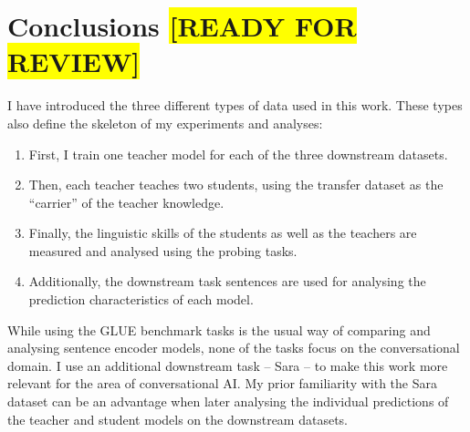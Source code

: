 \documentclass[bsc,frontabs,twoside,singlespacing,parskip,deptreport]{infthesis}
\def\reviewready{\colorbox{yellow}{[READY FOR REVIEW]}}
\begin{document}
{  \section{Conclusions \reviewready}{
    I have introduced the three different types of data used in this work. These types also define the skeleton of my experiments and analyses:
    \begin{enumerate}
      \item First, I train one teacher model for each of the three downstream datasets.
      \item Then, each teacher teaches two students, using the transfer dataset as the ``carrier'' of the teacher knowledge.
      \item Finally, the linguistic skills of the students as well as the teachers are measured and analysed using the probing tasks.
      \item Additionally, the downstream task sentences are used for analysing the prediction characteristics of each model.
    \end{enumerate}
    While using the GLUE benchmark tasks is the usual way of comparing and analysing sentence encoder models, none of the tasks focus on the conversational domain. I use an additional downstream task -- Sara -- to make this work more relevant for the area of conversational AI.
    My prior familiarity with the Sara dataset can be an advantage when later analysing the individual predictions of the teacher and student models on the downstream datasets.
  }
}
\end{document}
